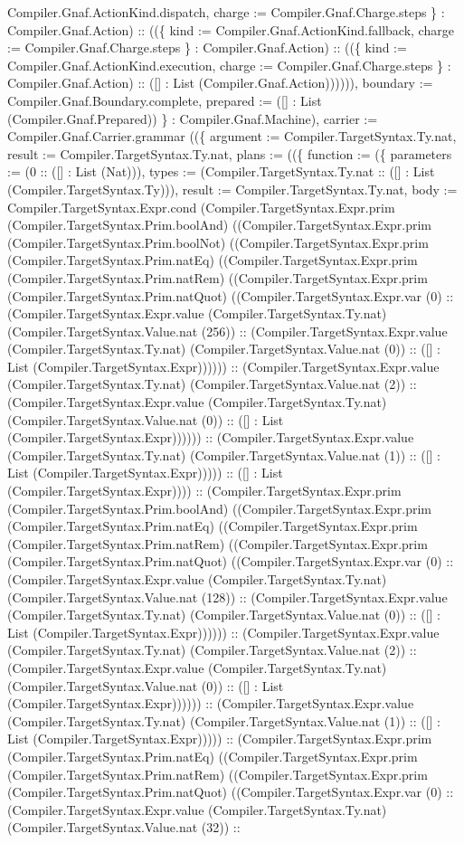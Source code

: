 \documentclass[11pt]{article}
\begin{document}
Compiler.Gnaf.ActionKind.dispatch, charge := Compiler.Gnaf.Charge.steps \} : Compiler.Gnaf.Action) :: ((\{ kind := Compiler.Gnaf.ActionKind.fallback, charge := Compiler.Gnaf.Charge.steps \} : Compiler.Gnaf.Action) :: ((\{ kind := Compiler.Gnaf.ActionKind.execution, charge := Compiler.Gnaf.Charge.steps \} : Compiler.Gnaf.Action) :: ([] : List (Compiler.Gnaf.Action)))))), boundary := Compiler.Gnaf.Boundary.complete, prepared := ([] : List (Compiler.Gnaf.Prepared)) \} : Compiler.Gnaf.Machine), carrier := Compiler.Gnaf.Carrier.grammar ((\{ argument := Compiler.TargetSyntax.Ty.nat, result := Compiler.TargetSyntax.Ty.nat, plans := ((\{ function := (\{ parameters := (0 :: ([] : List (Nat))), types := (Compiler.TargetSyntax.Ty.nat :: ([] : List (Compiler.TargetSyntax.Ty))), result := Compiler.TargetSyntax.Ty.nat, body := Compiler.TargetSyntax.Expr.cond (Compiler.TargetSyntax.Expr.prim (Compiler.TargetSyntax.Prim.boolAnd) ((Compiler.TargetSyntax.Expr.prim (Compiler.TargetSyntax.Prim.boolNot) ((Compiler.TargetSyntax.Expr.prim (Compiler.TargetSyntax.Prim.natEq) ((Compiler.TargetSyntax.Expr.prim (Compiler.TargetSyntax.Prim.natRem) ((Compiler.TargetSyntax.Expr.prim (Compiler.TargetSyntax.Prim.natQuot) ((Compiler.TargetSyntax.Expr.var (0) :: (Compiler.TargetSyntax.Expr.value (Compiler.TargetSyntax.Ty.nat) (Compiler.TargetSyntax.Value.nat (256)) :: (Compiler.TargetSyntax.Expr.value (Compiler.TargetSyntax.Ty.nat) (Compiler.TargetSyntax.Value.nat (0)) :: ([] : List (Compiler.TargetSyntax.Expr)))))) :: (Compiler.TargetSyntax.Expr.value (Compiler.TargetSyntax.Ty.nat) (Compiler.TargetSyntax.Value.nat (2)) :: (Compiler.TargetSyntax.Expr.value (Compiler.TargetSyntax.Ty.nat) (Compiler.TargetSyntax.Value.nat (0)) :: ([] : List (Compiler.TargetSyntax.Expr)))))) :: (Compiler.TargetSyntax.Expr.value (Compiler.TargetSyntax.Ty.nat) (Compiler.TargetSyntax.Value.nat (1)) :: ([] : List (Compiler.TargetSyntax.Expr))))) :: ([] : List (Compiler.TargetSyntax.Expr)))) :: (Compiler.TargetSyntax.Expr.prim (Compiler.TargetSyntax.Prim.boolAnd) ((Compiler.TargetSyntax.Expr.prim (Compiler.TargetSyntax.Prim.natEq) ((Compiler.TargetSyntax.Expr.prim (Compiler.TargetSyntax.Prim.natRem) ((Compiler.TargetSyntax.Expr.prim (Compiler.TargetSyntax.Prim.natQuot) ((Compiler.TargetSyntax.Expr.var (0) :: (Compiler.TargetSyntax.Expr.value (Compiler.TargetSyntax.Ty.nat) (Compiler.TargetSyntax.Value.nat (128)) :: (Compiler.TargetSyntax.Expr.value (Compiler.TargetSyntax.Ty.nat) (Compiler.TargetSyntax.Value.nat (0)) :: ([] : List (Compiler.TargetSyntax.Expr)))))) :: (Compiler.TargetSyntax.Expr.value (Compiler.TargetSyntax.Ty.nat) (Compiler.TargetSyntax.Value.nat (2)) :: (Compiler.TargetSyntax.Expr.value (Compiler.TargetSyntax.Ty.nat) (Compiler.TargetSyntax.Value.nat (0)) :: ([] : List (Compiler.TargetSyntax.Expr)))))) :: (Compiler.TargetSyntax.Expr.value (Compiler.TargetSyntax.Ty.nat) (Compiler.TargetSyntax.Value.nat (1)) :: ([] : List (Compiler.TargetSyntax.Expr))))) :: (Compiler.TargetSyntax.Expr.prim (Compiler.TargetSyntax.Prim.natEq) ((Compiler.TargetSyntax.Expr.prim (Compiler.TargetSyntax.Prim.natRem) ((Compiler.TargetSyntax.Expr.prim (Compiler.TargetSyntax.Prim.natQuot) ((Compiler.TargetSyntax.Expr.var (0) :: (Compiler.TargetSyntax.Expr.value (Compiler.TargetSyntax.Ty.nat) (Compiler.TargetSyntax.Value.nat (32)) :: 
\end{document}
